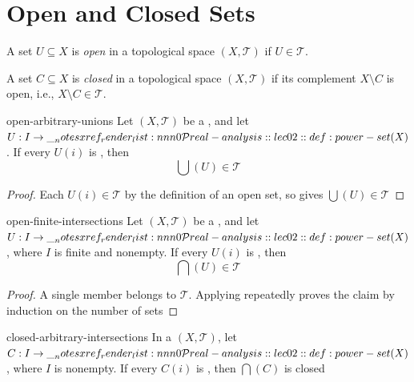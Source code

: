 \documentclass[12pt]{article}
\begin{document}
\section{Open and Closed Sets}

\begin{dfn}
  A set $U \subseteq X$ is \emph{open} in a topological space $(X, \mathcal{T})$ if $U \in \mathcal{T}$. 
\end{dfn}

\begin{dfn}
  A set $C \subseteq X$ is \emph{closed} in a topological space $(X, \mathcal{T})$ if its complement $X \setminus C$ is open, i.e., $X \setminus C \in \mathcal{T}$. 
\end{dfn}

\begin{cor}{open-arbitrary-unions}
  Let \((X,\mathcal T)\) be a
  , and let
  \(U:I\to\PowerSet(X)\). If every \(U(i)\) is
  , then
  \[
    \bigcup(U)\in\mathcal T
  \]
\end{cor}

\begin{proof}
  Each \(U(i)\in\mathcal T\) by the definition of an open set, so
  gives \(\bigcup(U)\in\mathcal T\)
\end{proof}

\begin{cor}{open-finite-intersections}
  Let \((X,\mathcal T)\) be a
  , and let
  \(U:I\to\PowerSet(X)\), where \(I\) is finite and nonempty.
  If every \(U(i)\) is , then
  \[
    \bigcap(U)\in\mathcal T
  \]
\end{cor}

\begin{proof}
  A single member belongs to \(\mathcal T\). Applying
  repeatedly proves the claim by induction on the number of sets
\end{proof}

\begin{cor}{closed-arbitrary-intersections}
  In a 
  \((X,\mathcal T)\), let
  \(C:I\to\PowerSet(X)\), where \(I\) is nonempty.
  If every \(C(i)\) is , then
  \(\bigcap(C)\) is closed
\end{cor}
\end{document}
